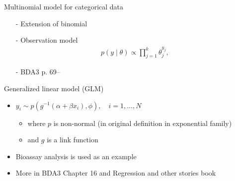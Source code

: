\documentclass[finnish,english,t]{beamer}
\begin{document}
\begin{frame}{Multinomial model for categorical data}

  \begin{itemize}
  \item[-] Extension of binomial
  \item[-] Observation model
    \begin{align*}
      p(y  \mid  \theta) \propto \prod_{j=1}^k \theta_j^{y_j},
    \end{align*}
  \item[-] BDA3 p. 69--
  \end{itemize}

\end{frame}

\begin{frame}{Generalized linear model (GLM)}

  \begin{itemize}
  \item<+-> $y_i \sim p(g^{-1}(\alpha + \beta x_i), \phi), \quad i = 1,\dots,N$
    \begin{itemize}
    \item where $p$ is non-normal (in original definition in
      exponential family)
    \item and $g$ is a link function
    \end{itemize}
  \item<+-> Bioassay analysis is used as an example
  \item<+-> More in BDA3 Chapter 16 and Regression and other stories
    book
  \end{itemize}
  
\end{frame}
\end{document}
